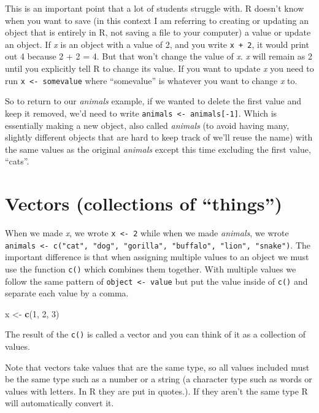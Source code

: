 \documentclass[
  12pt,
]{book}
\newenvironment{Shaded}{\begin{snugshade}}{\end{snugshade}}
\newcommand{\DecValTok}[1]{\textcolor[rgb]{0.06,0.06,0.06}{#1}}
\newcommand{\KeywordTok}[1]{\textcolor[rgb]{0.27,0.27,0.27}{\textbf{#1}}}
\newcommand{\NormalTok}[1]{#1}
\newcommand{\StringTok}[1]{\textcolor[rgb]{0.5,0.5,0.5}{#1}}
\begin{document}
This is an important point that a lot of students struggle with. R doesn't know when you want to save (in this context I am referring to creating or updating an object that is entirely in R, not saving a file to your computer) a value or update an object. If \emph{x} is an object with a value of 2, and you write \texttt{x\ +\ 2}, it would print out 4 because 2 + 2 = 4. But that won't change the value of \emph{x}. \emph{x} will remain as 2 until you explicitly tell R to change its value. If you want to update \emph{x} you need to run \texttt{x\ \textless{}-\ somevalue} where ``somevalue'' is whatever you want to change \emph{x} to.

So to return to our \emph{animals} example, if we wanted to delete the first value and keep it removed, we'd need to write \texttt{animals\ \textless{}-\ animals{[}-1{]}}. Which is essentially making a new object, also called \emph{animals} (to avoid having many, slightly different objects that are hard to keep track of we'll reuse the name) with the same values as the original \emph{animals} except this time excluding the first value, ``cats''.

\hypertarget{vectors}{%
\section{Vectors (collections of ``things'')}\label{vectors}}

When we made \emph{x}, we wrote \texttt{x\ \textless{}-\ 2} while when we made \emph{animals}, we wrote \texttt{animals\ \textless{}-\ c("cat",\ "dog",\ "gorilla",\ "buffalo",\ "lion",\ "snake")}. The important difference is that when assigning multiple values to an object we must use the function \texttt{c()} which \textbf{c}ombines them together. With multiple values we follow the same pattern of \texttt{object\ \textless{}-\ value} but put the value inside of \texttt{c()} and separate each value by a comma.

\begin{Shaded}
\begin{Highlighting}[]
\NormalTok{x \textless{}{-}}\StringTok{ }\KeywordTok{c}\NormalTok{(}\DecValTok{1}\NormalTok{, }\DecValTok{2}\NormalTok{, }\DecValTok{3}\NormalTok{)}
\end{Highlighting}
\end{Shaded}

The result of the \texttt{c()} is called a vector and you can think of it as a collection of values.

Note that vectors take values that are the same type, so all values included must be the same type such as a number or a string (a character type such as words or values with letters. In R they are put in quotes.). If they aren't the same type R will automatically convert it.
\end{document}
